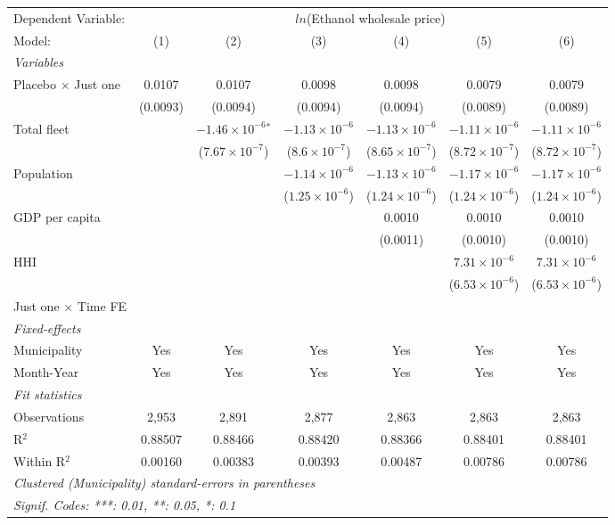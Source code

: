 \documentclass[
]{article}
\begin{document}
\begin{tabular}{lcccccc}
\tabularnewline\midrule\midrule
Dependent Variable:&\multicolumn{6}{c}{$ln$(Ethanol wholesale price)}\\
Model:&(1) & (2) & (3) & (4) & (5) & (6)\\
\midrule \emph{Variables}&   &   &   &   &   &  \\
Placebo $\times $ Just one & 0.0107 & 0.0107 & 0.0098 & 0.0098 & 0.0079 & 0.0079\\
  &(0.0093) & (0.0094) & (0.0094) & (0.0094) & (0.0089) & (0.0089)\\
Total fleet &    & $-1.46\times 10^{-6}$$^{*}$ & $-1.13\times 10^{-6}$ & $-1.13\times 10^{-6}$ & $-1.11\times 10^{-6}$ & $-1.11\times 10^{-6}$\\
  &   & ($7.67\times 10^{-7}$) & ($8.6\times 10^{-7}$) & ($8.65\times 10^{-7}$) & ($8.72\times 10^{-7}$) & ($8.72\times 10^{-7}$)\\
Population &    &    & $-1.14\times 10^{-6}$ & $-1.13\times 10^{-6}$ & $-1.17\times 10^{-6}$ & $-1.17\times 10^{-6}$\\
  &   &    & ($1.25\times 10^{-6}$) & ($1.24\times 10^{-6}$) & ($1.24\times 10^{-6}$) & ($1.24\times 10^{-6}$)\\
GDP per capita &    &    &    & 0.0010 & 0.0010 & 0.0010\\
  &   &    &    & (0.0011) & (0.0010) & (0.0010)\\
HHI &    &    &    &    & $7.31\times 10^{-6}$ & $7.31\times 10^{-6}$\\
  &   &    &    &    & ($6.53\times 10^{-6}$) & ($6.53\times 10^{-6}$)\\
Just one $\times$ Time FE &  &  &  &  &  & \\
\midrule \emph{Fixed-effects}&   &   &   &   &   &  \\
Municipality & Yes & Yes & Yes & Yes & Yes & Yes\\
Month-Year & Yes & Yes & Yes & Yes & Yes & Yes\\
\midrule \emph{Fit statistics}&  & & & & & \\
Observations & 2,953&2,891&2,877&2,863&2,863&2,863\\
R$^2$ & 0.88507&0.88466&0.88420&0.88366&0.88401&0.88401\\
Within R$^2$ & 0.00160&0.00383&0.00393&0.00487&0.00786&0.00786\\
\midrule\midrule\multicolumn{7}{l}{\emph{Clustered (Municipality) standard-errors in parentheses}}\\
\multicolumn{7}{l}{\emph{Signif. Codes: ***: 0.01, **: 0.05, *: 0.1}}\\
\end{tabular}
\end{document}
